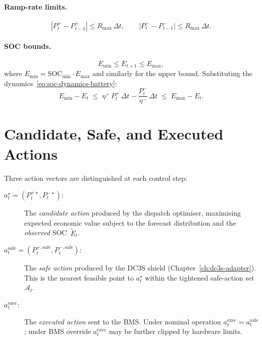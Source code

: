 \paragraph{Ramp-rate limits.}
\begin{equation}
\label{eq:ramp-limits}
  |P_t^{+} - P_{t-1}^{+}| \le R_{\max}\,\Delta t, \qquad
  |P_t^{-} - P_{t-1}^{-}| \le R_{\max}\,\Delta t.
\end{equation}

\paragraph{SOC bounds.}
\begin{equation}
\label{eq:soc-bounds}
  E_{\min} \le E_{t+1} \le E_{\max},
\end{equation}
where $E_{\min} = \mathrm{SOC}_{\min} \cdot E_{\max}$ and similarly for the
upper bound.  Substituting the dynamics~\eqref{eq:soc-dynamics-battery}:
\begin{equation}
\label{eq:soc-bounds-expanded}
  E_{\min} - E_t \;\le\;
    \eta^{+}\,P_t^{+}\,\Delta t - \frac{P_t^{-}}{\eta^{-}}\,\Delta t
  \;\le\; E_{\max} - E_t.
\end{equation}

\section{Candidate, Safe, and Executed Actions}

Three action vectors are distinguished at each control step:

\begin{description}
  \item[$a_t^\star = (P_t^{+\star}, P_t^{-\star})$:]
    The \emph{candidate action} produced by the dispatch optimiser, maximising
    expected economic value subject to the forecast distribution and the
    \emph{observed} SOC~$\tilde{E}_t$.

  \item[$a_t^{\mathrm{safe}} = (P_t^{+,\mathrm{safe}}, P_t^{-,\mathrm{safe}})$:]
    The \emph{safe action} produced by the DC3S shield
    (Chapter~\ref{ch:dc3s-adapter}).  This is the nearest feasible point to
    $a_t^\star$ within the tightened safe-action set~$\mathcal{A}_t$.

  \item[$a_t^{\mathrm{exec}}$:]
    The \emph{executed action} sent to the BMS.  Under nominal operation
    $a_t^{\mathrm{exec}} = a_t^{\mathrm{safe}}$; under BMS override
    $a_t^{\mathrm{exec}}$ may be further clipped by hardware limits.
\end{description}

